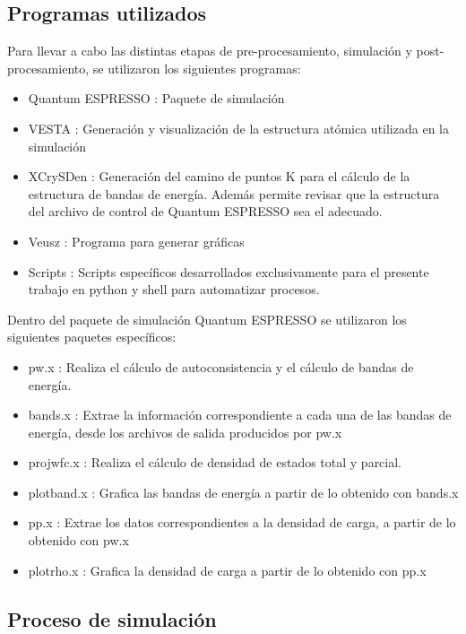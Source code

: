 \subsection{Programas utilizados}

Para llevar a cabo las distintas etapas de pre-procesamiento, 
simulaci\'on y 
post-procesamiento, se utilizaron
los siguientes programas:

\begin{itemize}
    \item Quantum ESPRESSO : Paquete de simulaci\'on
    \item VESTA : Generaci\'on y visualizaci\'on de la estructura at\'omica 
    utilizada en la simulaci\'on
    \item XCrySDen : Generaci\'on del camino de puntos K para el c\'alculo de 
    la estructura de bandas de energ\'ia. Adem\'as permite revisar que la 
    estructura del archivo de control de Quantum ESPRESSO sea el adecuado.
    \item Veusz : Programa para generar gr\'aficas
    \item Scripts : Scripts espec\'ificos desarrollados exclusivamente para el 
    presente trabajo en python y shell para automatizar procesos.
\end{itemize}

\noindent Dentro del paquete de simulaci\'on Quantum ESPRESSO se utilizaron los 
siguientes paquetes espec\'ificos:

\begin{itemize}
    \item pw.x : Realiza el c\'alculo de autoconsistencia y el c\'alculo de 
    bandas de energ\'ia.
    \item bands.x : Extrae la informaci\'on correspondiente a cada una 
    de las bandas de energ\'ia, desde los archivos de salida producidos por pw.x
    \item projwfc.x : Realiza el c\'alculo de densidad de estados total y 
    parcial.
    \item plotband.x : Grafica las bandas de energ\'ia a partir de lo obtenido 
    con bands.x
    \item pp.x : Extrae los datos correspondientes a la densidad de carga, a 
    partir de lo obtenido con pw.x
    \item plotrho.x : Grafica la densidad de carga a partir de lo obtenido con 
    pp.x
\end{itemize}

\subsection{Proceso de simulaci\'on}

